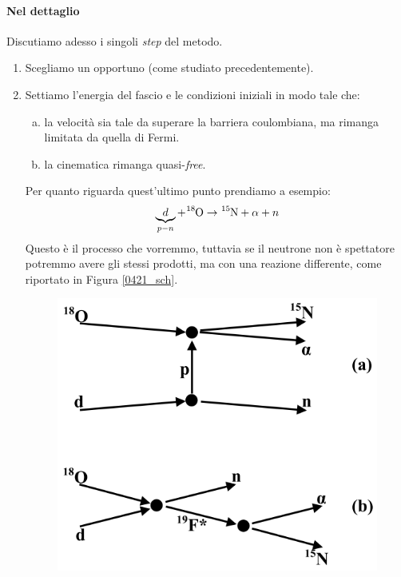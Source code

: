 \paragraph{Nel dettaglio}
Discutiamo adesso i singoli \textit{step} del metodo.
\begin{enumerate}
	\item Scegliamo un opportuno  (come studiato precedentemente).
	\item Settiamo l'energia del fascio e le condizioni iniziali in modo tale che:
	\begin{enumerate}[(a)]
		\item la velocità sia tale da superare la barriera coulombiana, ma rimanga limitata da quella di Fermi.
		\item la cinematica rimanga quasi-\textit{free}.
	\end{enumerate}
	\noindent Per quanto riguarda quest'ultimo punto prendiamo a esempio:
	$$\underbrace{d}_{p-n} + \ce{^{18}O} \to \ce{^{15}N} + \alpha + n$$
	Questo è il processo che vorremmo, tuttavia se il neutrone non è spettatore potremmo avere gli stessi prodotti, ma con una reazione differente, come riportato in Figura \ref{0421_sch}. 
	\begin{figure}[h]
		\centering
		\includegraphics[scale=0.5]{Immagini/0421_sch-cut1.png}

\end{figure}
\end{enumerate}
